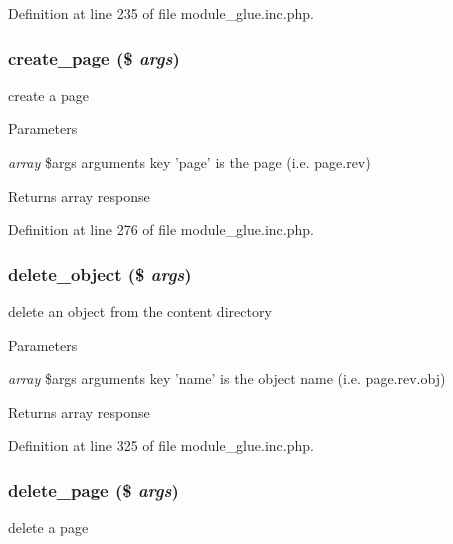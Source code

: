 Definition at line 235 of file module\_\-glue.inc.php.

\hypertarget{module__glue_8inc_8php_a9806cd2a9b829a24876b149753e819fb}{
\subsubsection[{create\_\-page}]{\setlength{\rightskip}{0pt plus 5cm}create\_\-page (\$ {\em args})}}
\label{module__glue_8inc_8php_a9806cd2a9b829a24876b149753e819fb}
create a page


\begin{DoxyParams}{Parameters}
\item[{\em array}]\$args arguments key 'page' is the page (i.e. page.rev) \end{DoxyParams}
\begin{DoxyReturn}{Returns}
array response 
\end{DoxyReturn}


Definition at line 276 of file module\_\-glue.inc.php.

\hypertarget{module__glue_8inc_8php_a51fdb1d1ff829d6d2d79a9f852b7e0ef}{
\subsubsection[{delete\_\-object}]{\setlength{\rightskip}{0pt plus 5cm}delete\_\-object (\$ {\em args})}}
\label{module__glue_8inc_8php_a51fdb1d1ff829d6d2d79a9f852b7e0ef}
delete an object from the content directory


\begin{DoxyParams}{Parameters}
\item[{\em array}]\$args arguments key 'name' is the object name (i.e. page.rev.obj) \end{DoxyParams}
\begin{DoxyReturn}{Returns}
array response 
\end{DoxyReturn}


Definition at line 325 of file module\_\-glue.inc.php.

\hypertarget{module__glue_8inc_8php_af11541a6869804225793b82e54fa09fe}{
\subsubsection[{delete\_\-page}]{\setlength{\rightskip}{0pt plus 5cm}delete\_\-page (\$ {\em args})}}
\label{module__glue_8inc_8php_af11541a6869804225793b82e54fa09fe}
delete a page


